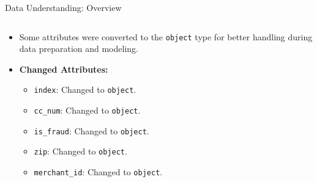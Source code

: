 \documentclass{beamer}
\begin{document}
\begin{frame}{Data Understanding: Overview}
    \begin{columns} %
        \begin{column}{0.6\textwidth}
        \begin{itemize}
            \item Some attributes were converted to the \texttt{object} type for better handling during data preparation and modeling.
            \item \textbf{Changed Attributes:}
            \begin{itemize}
                \item \texttt{index}: Changed to \texttt{object}.
                \item \texttt{cc\_num}: Changed to \texttt{object}.
                \item \texttt{is\_fraud}: Changed to \texttt{object}.
                \item \texttt{zip}: Changed to \texttt{object}.
                \item \texttt{merchant\_id}: Changed to \texttt{object}.
            \end{itemize}
        \end{itemize}
        \end{column}


\end{columns}
\end{frame}
\end{document}
